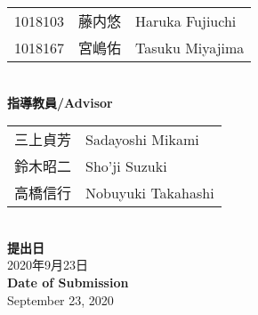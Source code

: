 \begin{titlepage}
\begin{center}
\begin{tabular}{lll}
1018103 & 藤内悠 & Haruka Fujiuchi\\
1018167 & 宮嶋佑 & Tasuku Miyajima\\
\end{tabular}
\vspace{5mm} \\
{\large\bf 指導教員/Advisor}\\
\begin{tabular}{ll}
三上貞芳 & Sadayoshi Mikami \\
鈴木昭二 & Sho'ji Suzuki\\
高橋信行 & Nobuyuki Takahashi\\
\end{tabular}
\vspace{5mm} \\
{\large\bf 提出日}\\
{\large 2020年9月23日}\vspace{2mm} \\
{\large\bf Date of Submission}\\
{\large September 23, 2020}
\end{center}
\end{titlepage}